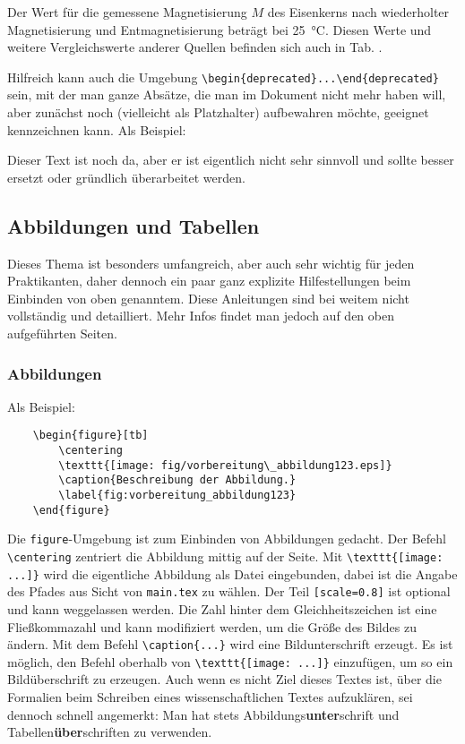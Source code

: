 Der Wert für die gemessene Magnetisierung $M$ des Eisenkerns nach wiederholter Magnetisierung und Entmagnetisierung beträgt  bei \SI{25}{\celsius}. Diesen Werte und weitere Vergleichswerte anderer Quellen befinden sich auch in Tab. .

Hilfreich kann auch die Umgebung \verb|\begin{deprecated}...\end{deprecated}| sein, mit der man ganze Absätze, die man im Dokument nicht mehr haben will, aber zunächst noch (vielleicht als Platzhalter) aufbewahren möchte, geeignet kennzeichnen kann. Als Beispiel:

\begin{deprecated}
Dieser Text ist noch da, aber er ist eigentlich nicht sehr sinnvoll und sollte besser ersetzt oder gründlich überarbeitet werden.
\end{deprecated}

\subsection{Abbildungen und Tabellen}
Dieses Thema ist besonders umfangreich, aber auch sehr wichtig für jeden Praktikanten, daher dennoch ein paar ganz explizite Hilfestellungen beim Einbinden von oben genanntem. Diese Anleitungen sind bei weitem nicht vollständig und detailliert. Mehr Infos findet man jedoch auf den oben aufgeführten Seiten.

\subsubsection{Abbildungen}
Als Beispiel:
\begin{verbatim}
	\begin{figure}[tb]
	    \centering
	    \texttt{[image: fig/vorbereitung\_abbildung123.eps]}
	    \caption{Beschreibung der Abbildung.}
	    \label{fig:vorbereitung_abbildung123}
	\end{figure}
\end{verbatim}
Die \verb|figure|-Umgebung ist zum Einbinden von Abbildungen gedacht. Der Befehl \verb|\centering| zentriert die Abbildung mittig auf der Seite. Mit \verb|\texttt{[image: ...]}| wird die eigentliche Abbildung als Datei eingebunden, dabei ist die Angabe des Pfades aus Sicht von \verb|main.tex| zu wählen. Der Teil \verb|[scale=0.8]| ist optional und kann weggelassen werden. Die Zahl hinter dem Gleichheitszeichen ist eine Fließkommazahl und kann modifiziert werden, um die Größe des Bildes zu ändern. Mit dem Befehl \verb|\caption{...}| wird eine Bildunterschrift erzeugt. Es ist möglich, den Befehl oberhalb von \verb|\texttt{[image: ...]}| einzufügen, um so ein Bildüberschrift zu erzeugen. Auch wenn es nicht Ziel dieses Textes ist, über die Formalien beim Schreiben eines wissenschaftlichen Textes aufzuklären, sei dennoch schnell angemerkt: Man hat stets Abbildungs\textbf{unter}schrift und Tabellen\textbf{über}schriften zu verwenden.

